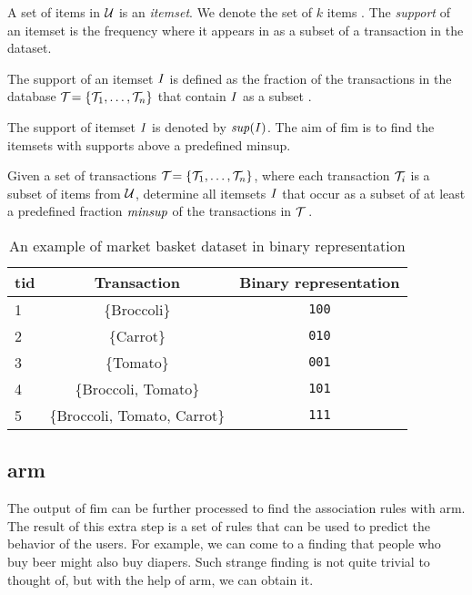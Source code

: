 A set of items in $\mathcal{U}$ is an \textit{itemset}. We denote the set of $k$ items \kItemset.
The \textit{support} of an itemset is the frequency where it appears in as a subset of a transaction in the dataset.

\begin{definition}[Support]
    The support of an itemset $\mathit{I}$ is defined as the fraction of the transactions in the database $\mathcal{T}_{} = \{\mathcal{T}_{1}, \dots, \mathcal{T}_{n}\}{}$ that contain $\mathit{I}$ as a subset \citep{Aggarwal15}.
\end{definition}

The support of itemset $\mathit{I}$ is denoted by $\mathit{sup({I})}$.
The aim of \acl{fim} is to find the itemsets with supports above a predefined \ac{minsup}.

\begin{definition}
    Given a set of transactions $\mathcal{T}_{} = \{\mathcal{T}_{1}, \dots, \mathcal{T}_{n}\}{}$, where each transaction $\mathcal{T}_{i}$ is a subset of items from $\mathcal{U}$, determine all itemsets $\mathit{I}$ that occur as a subset of at least a predefined fraction $\mathit{minsup}$ of the transactions in $\mathcal{T}_{}$ \citep{Aggarwal15}.
\end{definition}

\begin{table}[tb]
    \centering
    \begin{tabular}{|l|c|c|}
        \hline
        \textbf{\ac{tid}} & \textbf{Transaction}         & \textbf{Binary representation} \\ \hline
        1            & \{Broccoli\}                 & \texttt{100}                   \\ \hline
        2            & \{Carrot\}                   & \texttt{010}                   \\ \hline
        3            & \{Tomato\}                   & \texttt{001}                   \\ \hline
        4            & \{Broccoli, Tomato\}         & \texttt{101}                   \\ \hline
        5            & \{Broccoli, Tomato, Carrot\} & \texttt{111}                   \\ \hline
    \end{tabular}
    \caption{An example of market basket dataset in binary representation}
    \label{tab:market-basket-dataset}
\end{table}
\subsection{\Acl{arm}}
\label{sub:association_rule_mining}
The output of \ac{fim} can be further processed to find the association rules with \acl{arm}.
The result of this extra step is a set of rules that can be used to predict the behavior of the users.
For example, we can come to a finding that people who buy beer might also buy diapers.
Such strange finding is not quite trivial to thought of, but with the help of \acl{arm}, we can obtain it.

